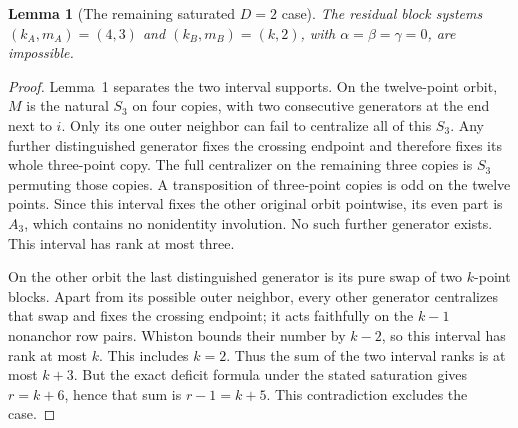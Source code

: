 \documentclass[11pt,a4paper]{article}
\newtheorem{lemma}{Lemma}
\begin{document}
\begin{lemma}[The remaining saturated $D=2$ case]
The residual block systems $(k_A,m_A)=(4,3)$ and
$(k_B,m_B)=(k,2)$, with $\alpha=\beta=\gamma=0$, are impossible.
\end{lemma}
\begin{proof}
Lemma~1 separates the two interval supports. On the twelve-point
orbit, $M$ is the natural $S_3$ on four copies, with two
consecutive generators at the end next to $i$. Only its one
outer neighbor can fail to centralize all of this $S_3$.
Any further distinguished generator fixes the crossing endpoint
and therefore fixes its whole three-point copy. The full
centralizer on the remaining three copies is $S_3$ permuting
those copies. A transposition of three-point copies is odd on
the twelve points. Since this interval fixes the other original
orbit pointwise, its even part is $A_3$, which contains no
nonidentity involution. No such further generator exists.
This interval has rank at most three.

On the other orbit the last distinguished generator is its
pure swap of two $k$-point blocks. Apart from its possible
outer neighbor, every other generator centralizes that swap
and fixes the crossing endpoint; it acts faithfully on the
$k-1$ nonanchor row pairs. Whiston bounds their number by
$k-2$, so this interval has rank at most $k$. This includes
$k=2$. Thus the sum of the two interval ranks is at most $k+3$.
But the exact deficit formula under the stated saturation gives
$r=k+6$, hence that sum is $r-1=k+5$. This contradiction
excludes the case.
\end{proof}
\end{document}
